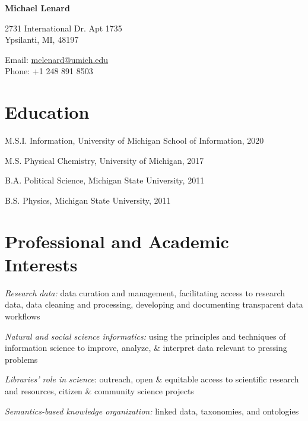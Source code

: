 \documentclass[12pt,letterpaper]{report}
\newcommand{\myname}{Michael Lenard}
\newcommand{\namefont}[1]{{\normalfont\bfseries\Huge{#1}}}
\newcommand{\listitemspace}{0.25em}
\renewenvironment{itemize}
{\begin{list}{}{\setlength{\leftmargin}{0em}
            \setlength{\parskip}{0em}
            \setlength{\itemsep}{\listitemspace}
            \setlength{\parsep}{\listitemspace}}}
{\end{list}}
\begin{document}
 \raggedright

\namefont{\myname}

\vspace{1em}
\begin{minipage}[t]{0.68\textwidth}
        2731 International Dr. Apt 1735 \\
Ypsilanti, MI, 48197
\end{minipage}
\begin{minipage}[t]{0.31\textwidth}
        Email: \href{mailto:mclenard@umich.edu}{mclenard@umich.edu} \\
        Phone: +1 248 891 8503
\end{minipage}
\vspace{0.5em}



\section*{Education}

\begin{tablist}

	\item[M.S.I.] \tab Information, University of Michigan School of Information, 2020

	\item[M.S.]  \tab Physical Chemistry, University of Michigan, 2017

	\item[B.A.]  \tab Political Science, Michigan State University, 2011
        
	\item[B.S.]  \tab Physics, Michigan State University, 2011

\end{tablist}



\section*{Professional and Academic Interests}

\begin{itemize}

	\item \textit{Research data:} data curation and management, facilitating access to research data, data cleaning and processing, developing and documenting transparent data workflows

	\item \textit{Natural and social science informatics:} using the principles and techniques of information science to improve, analyze, \& interpret data relevant to pressing problems

	\item \textit{Libraries' role in science}: outreach, open \& equitable access to scientific research and resources, citizen \& community science projects

	\item \textit{Semantics-based knowledge organization:} linked data, taxonomies, and ontologies

\end{itemize}
\end{document}

